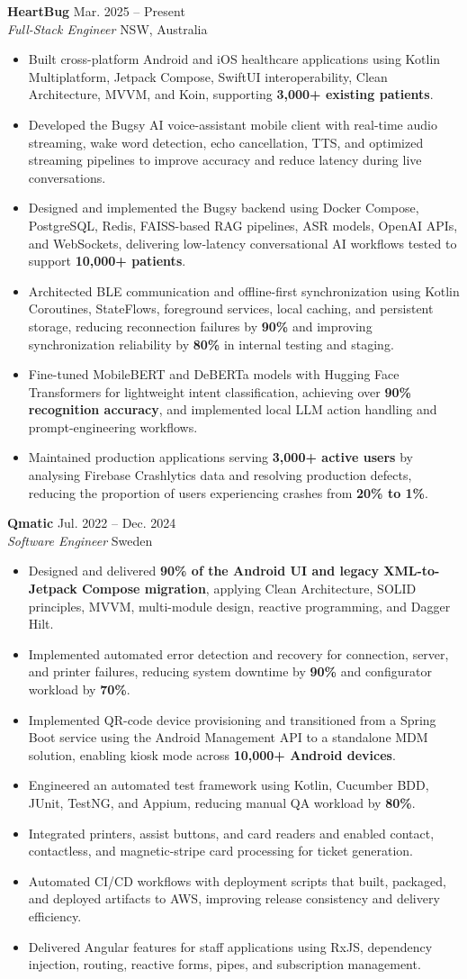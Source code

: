 \documentclass[letterpaper,11pt]{article}
\newcommand{\resumeItem}[1]{
  \item\small{#1}
}
\newcommand{\resumeSubheading}[4]{
  \vspace{1pt}\item
  \textbf{#1} \hfill {\small\color{muted-grey} #2} \\
  \textit{\small #3} \hfill {\small\color{muted-grey} #4}
  \vspace{-5pt}
}
\newcommand{\resumeItemListStart}{
  \begin{itemize}[leftmargin=0.18in, itemsep=2pt, topsep=4pt]
}
\newcommand{\resumeItemListEnd}{
  \end{itemize}\vspace{-2pt}
}
\begin{document}
  \resumeSubheading
    {HeartBug}{Mar. 2025 -- Present}
    {Full-Stack Engineer}{NSW, Australia}
    \resumeItemListStart
      \resumeItem{Built cross-platform Android and iOS healthcare applications using Kotlin Multiplatform, Jetpack Compose, SwiftUI interoperability, Clean Architecture, MVVM, and Koin, supporting \textbf{3,000+ existing patients}.}
      \resumeItem{Developed the Bugsy AI voice-assistant mobile client with real-time audio streaming, wake word detection, echo cancellation, TTS, and optimized streaming pipelines to improve accuracy and reduce latency during live conversations.}
      \resumeItem{Designed and implemented the Bugsy backend using Docker Compose, PostgreSQL, Redis, FAISS-based RAG pipelines, ASR models, OpenAI APIs, and WebSockets, delivering low-latency conversational AI workflows tested to support \textbf{10,000+ patients}.}
      \resumeItem{Architected BLE communication and offline-first synchronization using Kotlin Coroutines, StateFlows, foreground services, local caching, and persistent storage, reducing reconnection failures by \textbf{90\%} and improving synchronization reliability by \textbf{80\%} in internal testing and staging.}
      \resumeItem{Fine-tuned MobileBERT and DeBERTa models with Hugging Face Transformers for lightweight intent classification, achieving over \textbf{90\% recognition accuracy}, and implemented local LLM action handling and prompt-engineering workflows.}
      \resumeItem{Maintained production applications serving \textbf{3,000+ active users} by analysing Firebase Crashlytics data and resolving production defects, reducing the proportion of users experiencing crashes from \textbf{20\% to 1\%}.}
    \resumeItemListEnd

  \resumeSubheading
    {Qmatic}{Jul. 2022 -- Dec. 2024}
    {Software Engineer}{Sweden}
    \resumeItemListStart
      \resumeItem{Designed and delivered \textbf{90\% of the Android UI and legacy XML-to-Jetpack Compose migration}, applying Clean Architecture, SOLID principles, MVVM, multi-module design, reactive programming, and Dagger Hilt.}
      \resumeItem{Implemented automated error detection and recovery for connection, server, and printer failures, reducing system downtime by \textbf{90\%} and configurator workload by \textbf{70\%}.}
      \resumeItem{Implemented QR-code device provisioning and transitioned from a Spring Boot service using the Android Management API to a standalone MDM solution, enabling kiosk mode across \textbf{10,000+ Android devices}.}
      \resumeItem{Engineered an automated test framework using Kotlin, Cucumber BDD, JUnit, TestNG, and Appium, reducing manual QA workload by \textbf{80\%}.}
      \resumeItem{Integrated printers, assist buttons, and card readers and enabled contact, contactless, and magnetic-stripe card processing for ticket generation.}
      \resumeItem{Automated CI/CD workflows with deployment scripts that built, packaged, and deployed artifacts to AWS, improving release consistency and delivery efficiency.}
      \resumeItem{Delivered Angular features for staff applications using RxJS, dependency injection, routing, reactive forms, pipes, and subscription management.}
    \resumeItemListEnd
\end{document}
